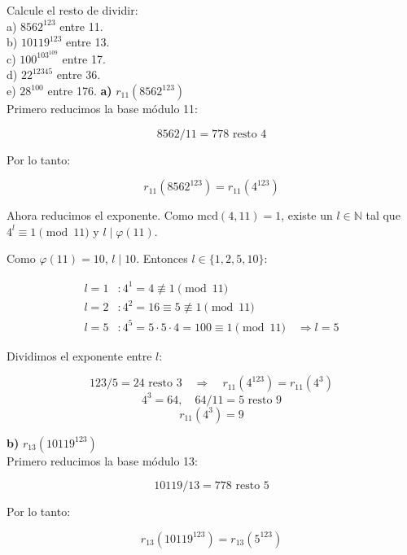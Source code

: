 \documentclass[a4paper,12pt]{article}
\begin{document}
\begin{ejercicio}[title=Ejercicio 28]
Calcule el resto de dividir: \\
a) $8562^{123}$ entre 11.\\
b) $10119^{123}$ entre 13.\\
c) $100^{103^{109}}$ entre 17.\\
d) $22^{12345}$ entre 36.\\
e) $28^{100}$ entre 176.
\tcblower
\textbf{a)} $r_{11}(8562^{123})$ \\
Primero reducimos la base módulo 11:

\[
8562 / 11 = 778 \text{ resto } 4
\]

Por lo tanto:

\[
r_{11}(8562^{123}) = r_{11}(4^{123})
\]

Ahora reducimos el exponente. Como $\mathrm{mcd}(4,11) = 1$, existe un $l \in \mathbb{N}$ tal que $4^l \equiv 1 \pmod{11}$ y $l \mid \varphi(11)$.

\vspace{0.5em}

Como $\varphi(11) = 10$, $l \mid 10$.  
Entonces $l \in \{1,2,5,10\}$:

\[
\begin{aligned}
l = 1 &: 4^1 = 4 \not\equiv 1 \pmod{11} \\
l = 2 &: 4^2 = 16 \equiv 5 \not\equiv 1 \pmod{11} \\
l = 5 &: 4^5 = 5 \cdot 5 \cdot 4 = 100 \equiv 1 \pmod{11} \quad \Rightarrow l = 5
\end{aligned}
\]

Dividimos el exponente entre $l$:

\[
123 / 5 = 24 \text{ resto } 3 \quad \Rightarrow \quad r_{11}(4^{123}) = r_{11}(4^3)
\]
\[
4^3 = 64, \quad 64 / 11 = 5 \text{ resto } 9
\]
\[
r_{11}(4^{3}) = \boxed{9}
\]

\textbf{b)} $r_{13}(10119^{123})$ \\

Primero reducimos la base módulo 13:

\[
10119 / 13 = 778 \text{ resto } 5
\]

Por lo tanto:

\[
r_{13}(10119^{123}) = r_{13}(5^{123})
\]

\end{ejercicio}
\end{document}
